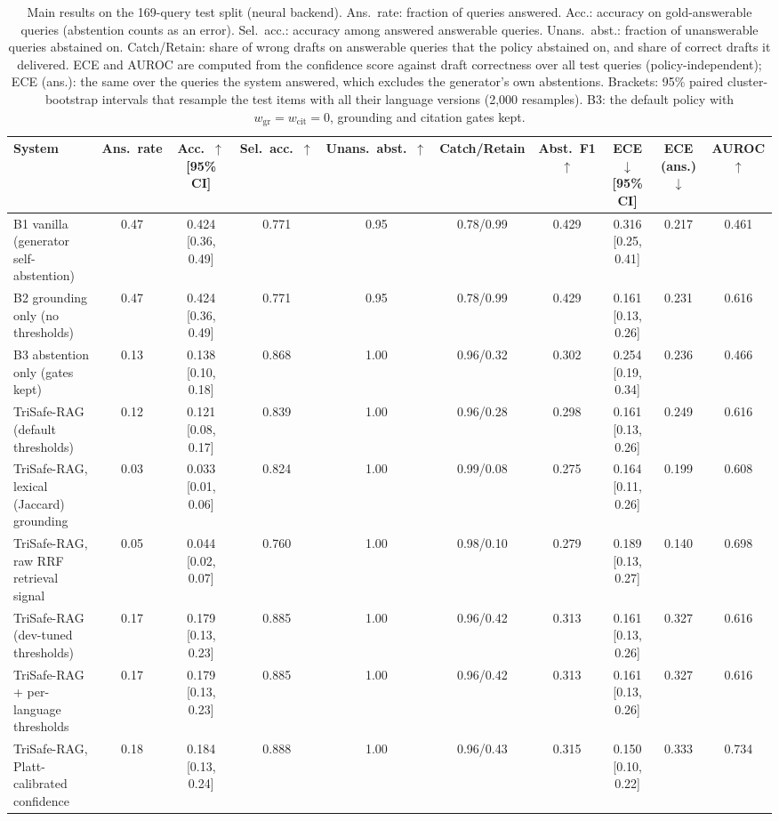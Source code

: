 \begin{table}[t]
  \caption{Main results on the 169-query test split (neural backend). Ans.\ rate: fraction of queries answered. Acc.: accuracy on gold-answerable queries (abstention counts as an error). Sel.\ acc.: accuracy among answered answerable queries. Unans.\ abst.: fraction of unanswerable queries abstained on. Catch/Retain: share of wrong drafts on answerable queries that the policy abstained on, and share of correct drafts it delivered. ECE and AUROC are computed from the confidence score against draft correctness over all test queries (policy-independent); ECE (ans.): the same over the queries the system answered, which excludes the generator's own abstentions. Brackets: 95\% paired cluster-bootstrap intervals that resample the test items with all their language versions (2{,}000 resamples). B3: the default policy with $w_{\mathrm{gr}}{=}w_{\mathrm{cit}}{=}0$, grounding and citation gates kept.}
  \label{tab:main-neural}
  \footnotesize
  \setlength{\tabcolsep}{2.5pt}
  \begin{tabular}{@{}lccccccccc@{}}
    \toprule
    System & Ans.\ rate & Acc.\ $\uparrow$ [95\% CI] & Sel.\ acc.\ $\uparrow$ & Unans.\ abst.\ $\uparrow$ & Catch/Retain & Abst.\ F1 $\uparrow$ & ECE $\downarrow$ [95\% CI] & ECE (ans.) $\downarrow$ & AUROC $\uparrow$ \\
    \midrule
    B1 vanilla (generator self-abstention) & 0.47 & 0.424 [0.36, 0.49] & 0.771 & 0.95 & 0.78/0.99 & 0.429 & 0.316 [0.25, 0.41] & 0.217 & 0.461 \\
    B2 grounding only (no thresholds) & 0.47 & 0.424 [0.36, 0.49] & 0.771 & 0.95 & 0.78/0.99 & 0.429 & 0.161 [0.13, 0.26] & 0.231 & 0.616 \\
    B3 abstention only (gates kept) & 0.13 & 0.138 [0.10, 0.18] & 0.868 & 1.00 & 0.96/0.32 & 0.302 & 0.254 [0.19, 0.34] & 0.236 & 0.466 \\
    TriSafe-RAG (default thresholds) & 0.12 & 0.121 [0.08, 0.17] & 0.839 & 1.00 & 0.96/0.28 & 0.298 & 0.161 [0.13, 0.26] & 0.249 & 0.616 \\
    TriSafe-RAG, lexical (Jaccard) grounding & 0.03 & 0.033 [0.01, 0.06] & 0.824 & 1.00 & 0.99/0.08 & 0.275 & 0.164 [0.11, 0.26] & 0.199 & 0.608 \\
    TriSafe-RAG, raw RRF retrieval signal & 0.05 & 0.044 [0.02, 0.07] & 0.760 & 1.00 & 0.98/0.10 & 0.279 & 0.189 [0.13, 0.27] & 0.140 & 0.698 \\
    TriSafe-RAG (dev-tuned thresholds) & 0.17 & 0.179 [0.13, 0.23] & 0.885 & 1.00 & 0.96/0.42 & 0.313 & 0.161 [0.13, 0.26] & 0.327 & 0.616 \\
    TriSafe-RAG + per-language thresholds & 0.17 & 0.179 [0.13, 0.23] & 0.885 & 1.00 & 0.96/0.42 & 0.313 & 0.161 [0.13, 0.26] & 0.327 & 0.616 \\
    TriSafe-RAG, Platt-calibrated confidence & 0.18 & 0.184 [0.13, 0.24] & 0.888 & 1.00 & 0.96/0.43 & 0.315 & 0.150 [0.10, 0.22] & 0.333 & 0.734 \\
    \bottomrule
  \end{tabular}
\end{table}
